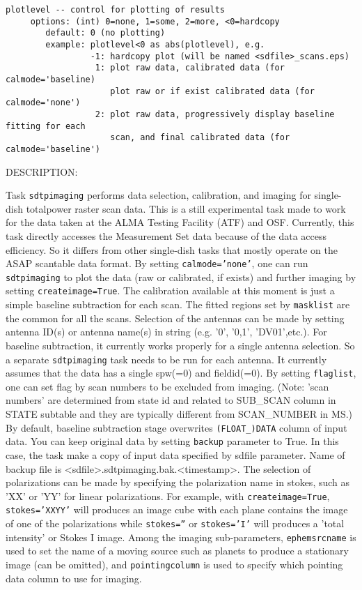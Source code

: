 \begin{verbatim}
plotlevel -- control for plotting of results
     options: (int) 0=none, 1=some, 2=more, <0=hardcopy
        default: 0 (no plotting)
        example: plotlevel<0 as abs(plotlevel), e.g.
                 -1: hardcopy plot (will be named <sdfile>_scans.eps)
                  1: plot raw data, calibrated data (for calmode='baseline)
                     plot raw or if exist calibrated data (for calmode='none')
                  2: plot raw data, progressively display baseline fitting for each 
                     scan, and final calibrated data (for calmode='baseline')  

\end{verbatim}
DESCRIPTION:

        Task {\tt sdtpimaging} performs data selection, calibration, and imaging for single-dish
        totalpower raster scan data.  This is a still experimental task made to work for
        the data taken at the ALMA Testing Facility (ATF) and OSF. Currently, this task directly
        accesses the Measurement Set data because of the data access efficiency.
        So it differs from other single-dish tasks that mostly operate on the ASAP scantable
        data format.  By setting {\tt calmode='none'}, one can run {\tt sdtpimaging} to plot the data
        (raw or calibrated, if exists) and further imaging by setting {\tt createimage=True}.
        The calibration available at this moment is just a simple baseline subtraction for
        each scan. The fitted regions set by {\tt masklist} are the common for all the scans.
        Selection of the antennas can be made by setting antenna ID(s) or antenna name(s)
        in string (e.g. '0', '0,1', 'DV01',etc.).
        For baseline subtraction, it currently works properly for a single antenna selection.
        So a separate {\tt sdtpimaging} task needs to be run for each antenna.
        It currently assumes that the data has a single spw(=0) and fieldid(=0).
        By setting {\tt flaglist}, one can set flag by scan numbers to be excluded from imaging.
        (Note: 'scan numbers' are determined from state id and related to SUB\_SCAN column in STATE
        subtable and they are typically different from SCAN\_NUMBER in MS.)
        By default, baseline subtraction stage overwrites \verb!(FLOAT_)DATA! column of input data. You can 
        keep original data by setting {\tt backup} parameter to True. In this case, the task make a 
        copy of input data specified by sdfile parameter. Name of backup file is <sdfile>.sdtpimaging.bak.<timestamp>. 
        The selection of polarizations can be made by specifying the polarization name in stokes,
        such as 'XX' or 'YY' for linear polarizations. For example, with {\tt createimage=True},
        {\tt stokes='XXYY'} will produces an image cube with each plane contains the image of one of 
        the polarizations while {\tt stokes=''} or {\tt stokes='I'} will produces a 'total intensity' or Stokes I image. 
        Among the imaging sub-parameters, {\tt ephemsrcname} is used to set the name of 
        a moving source such as planets to produce a stationary image (can be omitted), and
        {\tt pointingcolumn} is
        used to specify which pointing data column to use for imaging.

